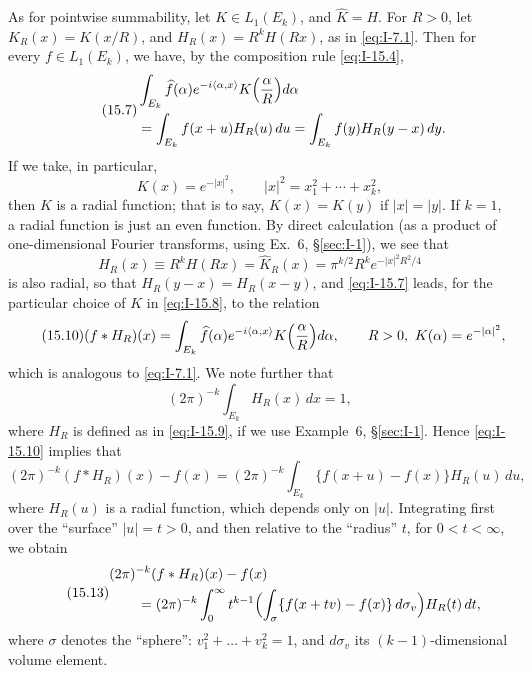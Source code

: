 As for pointwise summability, let $K\in L_1(E_k)$, and $\widehat K=H$. For $R>0$, let $K_R(x)=K(x/R)$, and $H_R(x)=R^kH(Rx)$, as in \eqref{eq:I-7.1}. Then for every $f\in L_1(E_k)$, we have, by the composition rule \eqref{eq:I-15.4},
\begin{equation}\label{eq:I-15.7}\tag{15.7}
\begin{aligned}
&\int_{E_k}\widehat f(\alpha)e^{-i\langle\alpha,x\rangle}K  \Bigl(\frac{\alpha}{R}\Bigr)d\alpha\\
&= \int_{E_k}f(x+u)H_R(u)\,du = \int_{E_k}f(y)H_R(y-x)\,dy.
\end{aligned}
\end{equation}
If we take, in particular,
\begin{equation}\label{eq:I-15.8}\tag{15.8}
K(x)=e^{-|x|^{2}},\qquad |x|^{2}=x_1^{2}+\cdots+x_k^{2},
\end{equation}
then $K$ is a radial function; that is to say, $K(x)=K(y)$ if $|x|=|y|$. If $k=1$, a radial function is just an even function. By direct calculation (as a product of one-dimensional Fourier transforms, using Ex.~6, \S\ref{sec:I-1}), we see that
\begin{equation}\label{eq:I-15.9}\tag{15.9}
H_R(x)\equiv R^kH(Rx)=\widehat K_R(x)=\pi^{k/2}R^ke^{-|x|^{2}R^{2}/4}
\end{equation}
is also radial, so that $H_R(y-x)=H_R(x-y)$, and \eqref{eq:I-15.7} leads, for the particular choice of $K$ in \eqref{eq:I-15.8}, to the relation
\begin{equation}\label{eq:I-15.10}\tag{15.10}
(f*H_R)(x)=\int_{E_k}\widehat f(\alpha)e^{-i\langle\alpha,x\rangle}K\Bigl(\frac{\alpha}{R}\Bigr)d\alpha,\qquad R>0,\ K(\alpha)=e^{-|\alpha|^{2}},
\end{equation}
which is analogous to \eqref{eq:I-7.1}. We note further that
\begin{equation}\label{eq:I-15.11}\tag{15.11}
(2\pi)^{-k}\int_{E_k}H_R(x)\,dx=1,
\end{equation}
where $H_R$ is defined as in \eqref{eq:I-15.9}, if we use Example~6, \S\ref{sec:I-1}. Hence \eqref{eq:I-15.10} implies that
\begin{equation}\label{eq:I-15.12}\tag{15.12}
(2\pi)^{-k}(f*H_R)(x)-f(x)=(2\pi)^{-k}\int_{E_k}\{f(x+u)-f(x)\}H_R(u)\,du,
\end{equation}
where $H_R(u)$ is a radial function, which depends only on $|u|$. Integrating first over the ``surface'' $|u|=t>0$, and then relative to the ``radius'' $t$, for $0<t<\infty$, we obtain
\begin{equation}\label{eq:I-15.13}\tag{15.13}
\begin{aligned}
&(2\pi)^{-k}(f*H_R)(x)-f(x)\\
&\qquad=(2\pi)^{-k}\int_{0}^{\infty}t^{k-1}\Bigl(\int_{\sigma}\{f(x+tv)-f(x)\}\,d\sigma_v\Bigr)H_R(t)\,dt,
\end{aligned}
\end{equation}
where $\sigma$ denotes the ``sphere'': $v_1^{2}+\ldots+v_k^{2}=1$, and $d\sigma_v$ its $(k-1)$-dimensional volume element.

